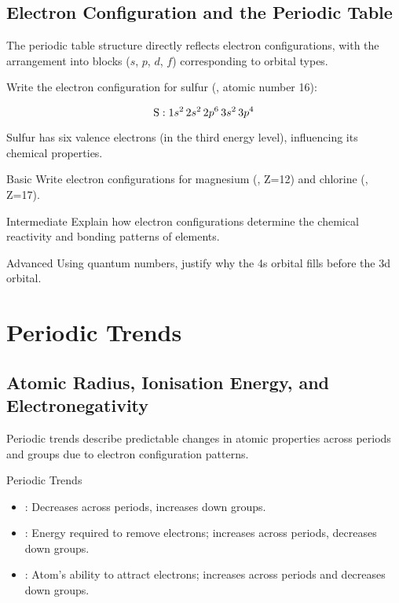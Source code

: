 \subsection{Electron Configuration and the Periodic Table}
\FloatBarrier
\FloatBarrier
\FloatBarrier

The periodic table structure directly reflects electron configurations, with the arrangement into blocks ($s$, $p$, $d$, $f$) corresponding to orbital types.

\begin{example}
Write the electron configuration for sulfur (, atomic number 16):

\[
\ce{S}: 1s^2\,2s^2\,2p^6\,3s^2\,3p^4
\]

Sulfur has six valence electrons (in the third energy level), influencing its chemical properties.
\end{example}

\begin{tieredquestions}{Basic}
Write electron configurations for magnesium (, Z=12) and chlorine (, Z=17).
\end{tieredquestions}

\begin{tieredquestions}{Intermediate}
Explain how electron configurations determine the chemical reactivity and bonding patterns of elements.
\end{tieredquestions}

\begin{tieredquestions}{Advanced}
Using quantum numbers, justify why the 4s orbital fills before the 3d orbital.
\end{tieredquestions}

\FloatBarrier

\section{Periodic Trends}
\FloatBarrier
\FloatBarrier
\FloatBarrier

\subsection{Atomic Radius, Ionisation Energy, and Electronegativity}
\FloatBarrier
\FloatBarrier
\FloatBarrier

Periodic trends describe predictable changes in atomic properties across periods and groups due to electron configuration patterns.

\begin{keyconcept}{Periodic Trends}
\begin{itemize}
    \item {}: Decreases across periods, increases down groups.
    \item {}: Energy required to remove electrons; increases across periods, decreases down groups.
    \item {}: Atom's ability to attract electrons; increases across periods and decreases down groups.
\end{itemize}
\end{keyconcept}

